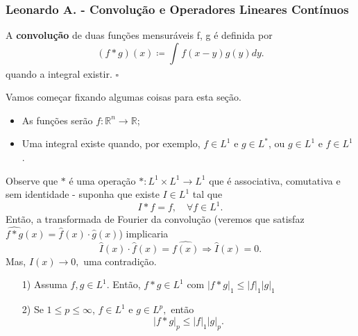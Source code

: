 \documentclass[MeasureTheory/measure_theory.tex]{subfiles}
\begin{document}
\subsubsection*{Leonardo A. - Convolução e Operadores Lineares Contínuos}
\begin{def*}
	A \textbf{convolução} de duas funções mensuráveis f, g é definida por
	\[
		(f*g)(x)\coloneqq \int_{}^{}f(x-y)g(y)dy.
	\]
	quando a integral existir. \(\square\)
\end{def*}
Vamos começar fixando algumas coisas para esta seção.
\begin{itemize}
	\item As funções serão \(f:\mathbb{R}^{n}\rightarrow \mathbb{R}\);
	\item Uma integral existe quando, por exemplo, \(f\in L^{1} \text{ e } g\in L^{*}\), ou \(g\in L^{1}\text{ e }f\in L^{1}\).
\end{itemize}
Observe que \(*\) é uma operação \(*:L^{1}\times L^{1}\rightarrow L^{1}\) que é associativa, comutativa e sem identidade - suponha que existe \(I\in L^{1}\) tal que
\[
	I*f = f,\quad \forall f\in L^{1}.
\]
Então, a transformada de Fourier da convolução (veremos que satisfaz \(\widehat{f*g}(x) = \hat{f}(x)\cdot \hat{g}(x)\)) implicaria
\[
	\hat{I}(x)\cdot \hat{f}(x) = \hat{f(x)} \Rightarrow \hat{I}(x) = 0.
\]
Mas, \(\hat{I}(x)\to 0,\) uma contradição.
\begin{prop*}
	\begin{itemize}
		\item[1)]Assuma \(f, g\in L^{1}.\) Então,  \(f*g\in L^{1}\) com \(|f*g|_1\leq |f|_1|g|_1\)
		\item[2)] Se \(1\leq p\leq \infty\), \(f\in L^{1}\) e \(g\in L^{p},\) então
		      \[
			      |f*g|_p \leq |f|_1|g|_p.
		      \]
	\end{itemize}
\end{prop*}
\end{document}
